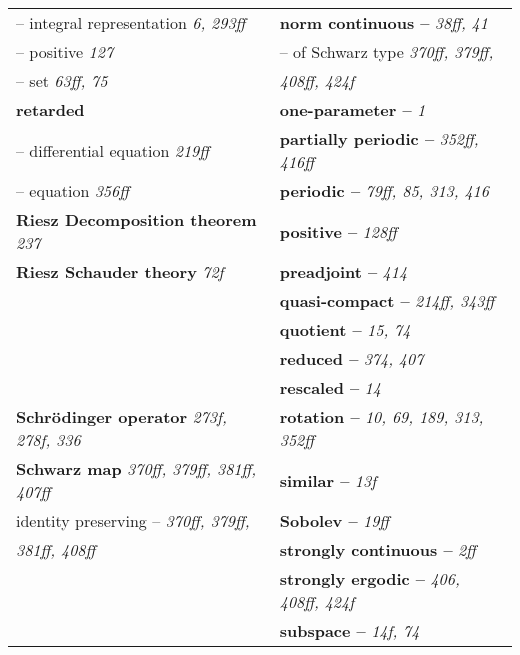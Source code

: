 \documentclass{article}
\begin{document}
\begin{longtable}{p{}p{}}
\quad -- integral representation \textit{6, 293ff} & \textbf{norm continuous --} \textit{38ff, 41} \\
\quad -- positive \textit{127} & \quad -- of Schwarz type \textit{370ff, 379ff,} \\
\quad -- set \textit{63ff, 75} & \quad\quad \textit{408ff, 424f} \\
\textbf{retarded} & \textbf{one-parameter --} \textit{1} \\
\quad -- differential equation \textit{219ff} & \textbf{partially periodic --} \textit{352ff, 416ff} \\
\quad -- equation \textit{356ff} & \textbf{periodic --} \textit{79ff, 85, 313, 416} \\
\textbf{Riesz Decomposition theorem} \textit{237} & \textbf{positive --} \textit{128ff} \\
\textbf{Riesz Schauder theory} \textit{72f} & \textbf{preadjoint --} \textit{414} \\
& \textbf{quasi-compact --} \textit{214ff, 343ff} \\
& \textbf{quotient --} \textit{15, 74} \\
& \textbf{reduced --} \textit{374, 407} \\
& \textbf{rescaled --} \textit{14} \\
\textbf{Schrödinger operator} \textit{273f, 278f, 336} & \textbf{rotation --} \textit{10, 69, 189, 313, 352ff} \\
\textbf{Schwarz map} \textit{370ff, 379ff, 381ff, 407ff} & \textbf{similar --} \textit{13f} \\
\quad identity preserving -- \textit{370ff, 379ff,} & \textbf{Sobolev --} \textit{19ff} \\
\quad\quad \textit{381ff, 408ff} & \textbf{strongly continuous --} \textit{2ff} \\
& \textbf{strongly ergodic --} \textit{406, 408ff, 424f} \\
& \textbf{subspace --} \textit{14f, 74} \\


\end{longtable}
\end{document}

